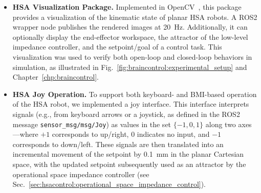 \begin{itemize}
    \item \textbf{HSA Visualization Package.} Implemented in OpenCV~\citep{bradski2000opencv}, this package provides a visualization of the kinematic state of planar \gls{HSA} robots. A ROS2 wrapper node publishes the rendered images at \SI{20}{Hz}. Additionally, it can optionally display the end-effector workspace, the attractor of the low-level impedance controller, and the setpoint/goal of a control task. This visualization was used to verify both open-loop and closed-loop behaviors in simulation, as illustrated in Fig.~\ref{fig:braincontrol:experimental_setup} and Chapter~\ref{chp:braincontrol}.
    \item \textbf{HSA Joy Operation.} To support both keyboard- and \gls{BMI}-based operation of the \gls{HSA} robot, we implemented a joy interface. This interface interprets signals (e.g., from keyboard arrows or a joystick, as defined in the ROS2 message \texttt{sensor\_msg/msg/Joy}) as values in the set $\{-1, 0, 1\}$ along two axes—where $+1$ corresponds to up/right, $0$ indicates no input, and $-1$ corresponds to down/left. These signals are then translated into an incremental movement of the setpoint by \SI{0.1}{mm} in the planar Cartesian space, with the updated setpoint subsequently used as an attractor by the operational space impedance controller (see Sec.~\ref{sec:hsacontrol:operational_space_impedance_control}).

\end{itemize}
